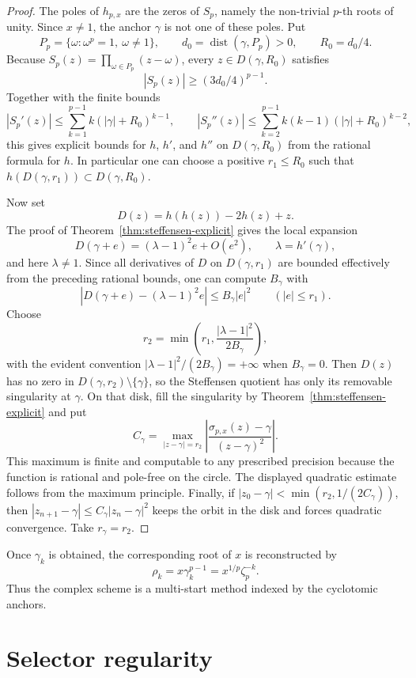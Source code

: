 \documentclass[10pt,a4paper]{article}
\theoremstyle{plain}
\theoremstyle{definition}
\theoremstyle{remark}
\newcommand{\stef}{\sigma_{p,x}}
\newcommand{\dist}{\operatorname{dist}}
\begin{document}
\begin{proof}
The poles of $h_{p,x}$ are the zeros of $S_p$, namely the non-trivial
$p$-th roots of unity.  Since $x\ne1$, the anchor $\gamma$ is not one of these
poles.  Put
\[
  P_p=\{\omega:\omega^p=1,\ \omega\ne1\},
  \qquad
  d_0=\dist(\gamma,P_p)>0,
  \qquad
  R_0=d_0/4.
\]
Because $S_p(z)=\prod_{\omega\in P_p}(z-\omega)$, every
$z\in D(\gamma,R_0)$ satisfies
\[
  |S_p(z)|\ge (3d_0/4)^{p-1}.
\]
Together with the finite bounds
\[
  |S_p'(z)|\le\sum_{k=1}^{p-1}k(|\gamma|+R_0)^{k-1},
  \qquad
  |S_p''(z)|\le\sum_{k=2}^{p-1}k(k-1)(|\gamma|+R_0)^{k-2},
\]
this gives explicit bounds for $h$, $h'$, and $h''$ on $D(\gamma,R_0)$ from
the rational formula for $h$.  In particular one can choose a positive
$r_1\le R_0$ such that $h(D(\gamma,r_1))\subset D(\gamma,R_0)$.

Now set
\[
  D(z)=h(h(z))-2h(z)+z.
\]
The proof of Theorem~\ref{thm:steffensen-explicit} gives the local expansion
\[
  D(\gamma+e)=(\lambda-1)^2e+O(e^2),
  \qquad \lambda=h'(\gamma),
\]
and here $\lambda\ne1$.  Since all derivatives of $D$ on
$D(\gamma,r_1)$ are bounded effectively from the preceding rational bounds, one
can compute $B_\gamma$ with
\[
  |D(\gamma+e)-(\lambda-1)^2e|\le B_\gamma |e|^2
  \qquad(|e|\le r_1).
\]
Choose
\[
  r_2=\min\left(r_1,\frac{|\lambda-1|^2}{2B_\gamma}\right),
\]
with the evident convention $|\lambda-1|^2/(2B_\gamma)=+\infty$ when
$B_\gamma=0$.  Then $D(z)$ has no zero in $D(\gamma,r_2)\setminus\{\gamma\}$,
so the Steffensen quotient has only its removable singularity at $\gamma$.
On that disk, fill the singularity by Theorem~\ref{thm:steffensen-explicit} and
put
\[
  C_\gamma=
  \max_{|z-\gamma|=r_2}
  \left|\frac{\stef(z)-\gamma}{(z-\gamma)^2}\right|.
\]
This maximum is finite and computable to any prescribed precision because the
function is rational and pole-free on the circle.  The displayed quadratic
estimate follows from the maximum principle.  Finally, if
$|z_0-\gamma|<\min(r_2,1/(2C_\gamma))$, then
$|z_{n+1}-\gamma|\le C_\gamma |z_n-\gamma|^2$ keeps the orbit in the disk and
forces quadratic convergence.  Take $r_\gamma=r_2$.
\end{proof}

Once $\gamma_k$ is obtained, the corresponding root of $x$ is reconstructed by
\[
  \rho_k=x\gamma_k^{p-1}=x^{1/p}\zeta_p^{-k}.
\]
Thus the complex scheme is a multi-start method indexed by the cyclotomic
anchors.

\section{Selector regularity}
\label{sec:selector-regularity}
\end{document}
